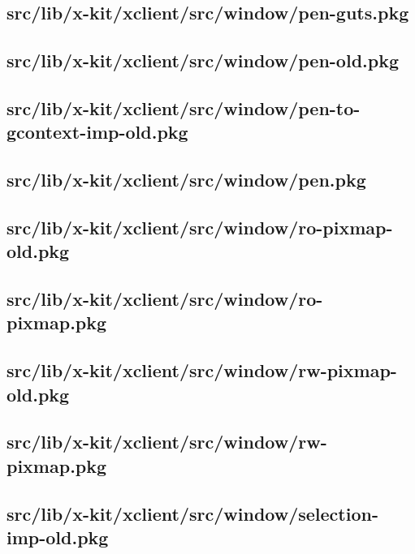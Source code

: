 \subsection{src/lib/x-kit/xclient/src/window/pen-guts.pkg}


\subsection{src/lib/x-kit/xclient/src/window/pen-old.pkg}


\subsection{src/lib/x-kit/xclient/src/window/pen-to-gcontext-imp-old.pkg}


\subsection{src/lib/x-kit/xclient/src/window/pen.pkg}


\subsection{src/lib/x-kit/xclient/src/window/ro-pixmap-old.pkg}


\subsection{src/lib/x-kit/xclient/src/window/ro-pixmap.pkg}


\subsection{src/lib/x-kit/xclient/src/window/rw-pixmap-old.pkg}


\subsection{src/lib/x-kit/xclient/src/window/rw-pixmap.pkg}


\subsection{src/lib/x-kit/xclient/src/window/selection-imp-old.pkg}


